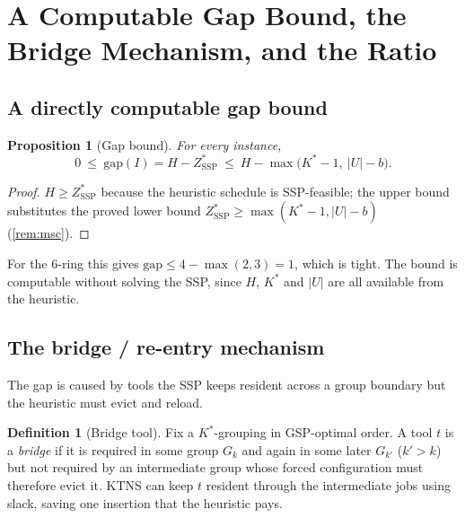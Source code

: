 \documentclass[11pt,a4paper]{article}
\theoremstyle{plain}
\newtheorem{proposition}[theorem]{Proposition}
\theoremstyle{definition}
\newtheorem{definition}[theorem]{Definition}
\newcommand{\Kstar}{K^{*}}
\newcommand{\ZSSP}{Z_{\mathrm{SSP}}^{*}}
\begin{document}
\section{A Computable Gap Bound, the Bridge Mechanism, and the Ratio}
\label{sec:ratio}

\subsection{A directly computable gap bound}

\begin{thmbox}
\begin{proposition}[Gap bound]
\label{prop:gapbound}
For every instance,
\[
  0\ \le\ \mathrm{gap}(I)=H-\ZSSP\ \le\ H-\max\bigl(\Kstar-1,\ |U|-b\bigr).
\]
\end{proposition}
\end{thmbox}
\begin{proofbox}
\begin{proof}
$H\ge\ZSSP$ because the heuristic schedule is SSP-feasible; the upper bound substitutes
the proved lower bound $\ZSSP\ge\max(\Kstar-1,|U|-b)$ (\cref{rem:msc}).
\end{proof}
\end{proofbox}

\noindent For the $6$-ring this gives $\mathrm{gap}\le 4-\max(2,3)=1$, which is tight.
The bound is computable without solving the SSP, since $H$, $\Kstar$ and $|U|$ are all
available from the heuristic.

\subsection{The bridge / re-entry mechanism}

The gap is caused by tools the SSP keeps resident across a group boundary but the
heuristic must evict and reload.

\begin{definition}[Bridge tool]
\label{def:bridge}
Fix a $\Kstar$-grouping in GSP-optimal order. A tool $t$ is a \emph{bridge} if it is
required in some group $G_k$ and again in some later $G_{k'}$ ($k'>k$) but not required by
an intermediate group whose forced configuration must therefore evict it. KTNS can keep
$t$ resident through the intermediate jobs using slack, saving one insertion that the
heuristic pays.
\end{definition}
\end{document}
